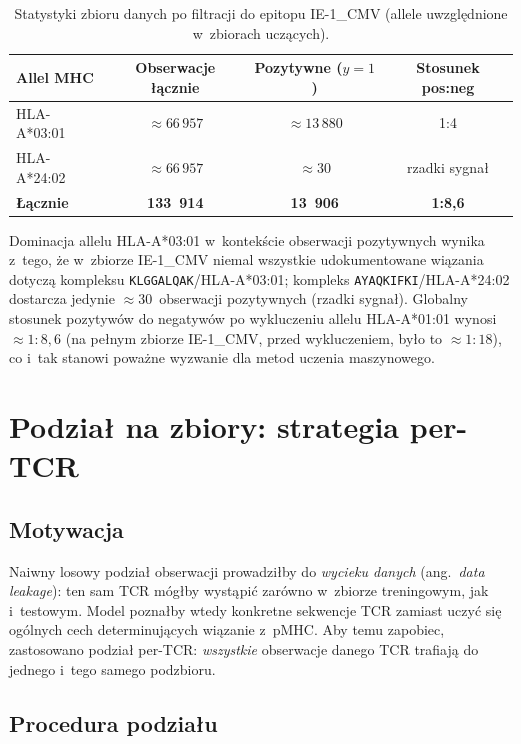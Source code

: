 \documentclass{SGGW-thesis}
\begin{document}
\begin{table}[htbp]
\centering
\small
\caption{Statystyki zbioru danych po filtracji do epitopu IE-1\_CMV (allele uwzględnione w~zbiorach uczących).}
\label{tab:dataset_stats}
\begin{tabular}{lccc}
\toprule
\textbf{Allel MHC} & \textbf{Obserwacje łącznie} & \textbf{Pozytywne ($y{=}1$)} & \textbf{Stosunek pos:neg} \\
\midrule
HLA-A*03:01 & ${\approx}66\,957$ & ${\approx}13\,880$ & 1:4 \\
HLA-A*24:02 & ${\approx}66\,957$ & ${\approx}30$      & rzadki sygnał \\
\midrule
\textbf{Łącznie} & \textbf{133~914} & \textbf{13~906} & \textbf{1:8,6} \\
\bottomrule
\end{tabular}
\end{table}

Dominacja allelu HLA-A*03:01 w~kontekście obserwacji pozytywnych wynika z~tego, że w~zbiorze
IE-1\_CMV niemal wszystkie udokumentowane wiązania dotyczą kompleksu \texttt{KLGGALQAK}/HLA-A*03:01;
kompleks \texttt{AYAQKIFKI}/HLA-A*24:02 dostarcza jedynie ${\approx}30$~obserwacji pozytywnych
(rzadki sygnał). Globalny stosunek pozytywów do negatywów po wykluczeniu
allelu HLA-A*01:01 wynosi ${\approx}1{:}8{,}6$ (na pełnym zbiorze IE-1\_CMV, przed wykluczeniem,
było to ${\approx}1{:}18$), co i~tak stanowi poważne wyzwanie dla metod uczenia maszynowego.

\section{Podział na zbiory: strategia per-TCR}

\subsection{Motywacja}

Naiwny losowy podział obserwacji prowadziłby do \textit{wycieku danych} (ang.\ \textit{data leakage}):
ten sam TCR mógłby wystąpić zarówno w~zbiorze treningowym, jak i~testowym. Model poznałby wtedy
konkretne sekwencje TCR zamiast uczyć się ogólnych cech determinujących wiązanie z~pMHC.
Aby temu zapobiec, zastosowano podział per-TCR: \textit{wszystkie} obserwacje danego TCR trafiają
do jednego i~tego samego podzbioru.

\subsection{Procedura podziału}
\end{document}
